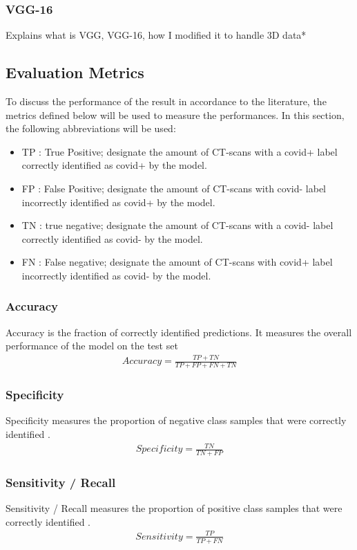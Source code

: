 \documentclass[12pt, letterpaper]{article}
\begin{document}
\subsubsection{VGG-16}
Explains what is VGG, VGG-16, how I modified it to handle 3D data*

\subsection{Evaluation Metrics}
To discuss the performance of the result in accordance to the literature, the metrics defined below will be used to measure the performances. In this section, the following abbreviations will be used: 
\begin{itemize}
    \item TP : True Positive; designate the amount of CT-scans with a covid+ label correctly identified as covid+ by the model.
    \item FP : False Positive; designate the amount of CT-scans with covid- label incorrectly identified as covid+ by the model.
    \item TN : true negative; designate the amount of CT-scans with a covid- label correctly identified as covid- by the model.
    \item FN : False negative; designate the amount of CT-scans with covid+ label incorrectly identified as covid- by the model.
\end{itemize}

\subsubsection{Accuracy}
Accuracy is the fraction of correctly identified predictions. It measures the overall performance of the model on the test set \cite{Karthik_2021}
\begin{align}
Accuracy = \frac{TP + TN}{TP + FP + FN + TN}
\end{align}

\subsubsection{Specificity}
Specificity measures the proportion of negative class samples that were correctly identified \cite{Karthik_2021}.
\begin{align}
Specificity = \frac{TN}{TN + FP}
\end{align}

\subsubsection{Sensitivity / Recall}
Sensitivity / Recall measures the proportion of positive class samples that were correctly identified \cite{Karthik_2021}.
\begin{align}
    Sensitivity = \frac{TP}{TP + FN}
\end{align}
\end{document}
